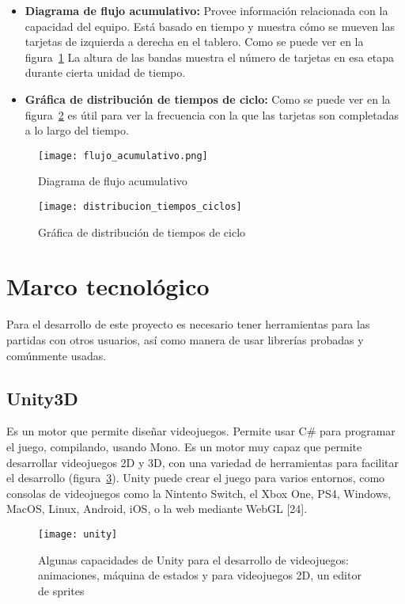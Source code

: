\begin{itemize}
    \item \textbf{Diagrama de flujo acumulativo:} Provee información relacionada con la capacidad del equipo. Está basado en tiempo y muestra cómo se mueven las tarjetas de izquierda a derecha en el tablero. Como se puede ver en la figura~\ref{fig:flujo_acumulativo} La altura de las bandas muestra el número de tarjetas en esa etapa durante cierta unidad de tiempo.
    \item \textbf{Gráfica de distribución de tiempos de ciclo:} Como se puede ver en la figura~\ref{fig:distribucion_tiempos_ciclos} es útil para ver la frecuencia con la que las tarjetas son completadas a lo largo del tiempo.
\end{itemize}

\begin{figure}[h!]
    \centering
    \texttt{[image: flujo\_acumulativo.png]}
        \caption{Diagrama de flujo acumulativo}
    \label{fig:flujo_acumulativo}
\end{figure}

\begin{figure}[h!]
    \centering
    \texttt{[image: distribucion\_tiempos\_ciclos]}
    \caption{Gráfica de distribución de tiempos de ciclo}
    \label{fig:distribucion_tiempos_ciclos}
\end{figure}

\section{Marco tecnológico}
Para el desarrollo de este proyecto es necesario tener herramientas para las partidas con otros usuarios, así como manera de usar librerías probadas y comúnmente usadas.

\subsection{Unity3D}
Es un motor que permite diseñar videojuegos. Permite usar C\# para programar el juego, compilando, usando Mono\cite{unity2019}. Es un motor muy capaz que permite desarrollar videojuegos 2D y 3D, con una variedad de herramientas para facilitar el desarrollo (figura~\ref{fig:unity_screenshot}).
Unity puede crear el juego para varios entornos, como consolas de videojuegos como la Nintento Switch, el Xbox One, PS4, Windows, MacOS, Linux, Android, iOS, o la web mediante WebGL [24].
\begin{figure}[h]
    \centering
    \texttt{[image: unity]}
        \caption{Algunas capacidades de Unity para el desarrollo de videojuegos: animaciones, máquina de estados y para videojuegos 2D, un editor de sprites}
        \label{fig:unity_screenshot}
\end{figure}

